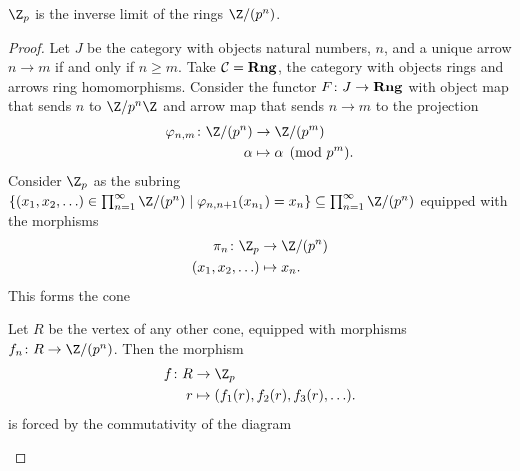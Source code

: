 \documentclass[10pt]{amsart}
\begin{document}
\begin{thm}\label{ex3}
  $\Z_p$ is the inverse limit of the rings $\Z/(p^n)$.
  \begin{proof}
    Let $J$ be the category with objects natural numbers, $n$, and a unique arrow $n \rightarrow m$ if and only if $n \geq m$.
    Take $\mathcal{C} = {\bf Rng}$, the category with objects rings and arrows ring homomorphisms.
    Consider the functor $F \colon J \rightarrow {\bf Rng}$ with object map that sends $n$ to $\Z/p^n\Z$ and arrow map that sends $n \rightarrow m$ to the projection 
    \begin{align*}
      \varphi_{n,m} \colon \Z/(p^n) &\rightarrow \Z/(p^m)\\
      \alpha &\mapsto \alpha \pmod{p^m}.
    \end{align*}
    Consider $\Z_p$ as the subring
    $\left\{(x_1, x_2, \ldots) \in \prod_{n=1}^\infty \Z/(p^n) \;\middle\vert\; \varphi_{n,n+1}(x_{n_1}) = x_n \right\} \subseteq \prod_{n=1}^\infty \Z/(p^n)$
    equipped with the morphisms 
    \begin{align*}
      \pi_n \colon \Z_p &\rightarrow \Z/(p^n)\\
      (x_1, x_2, \ldots) & \mapsto x_n.
    \end{align*}
    This forms the cone
    \begin{center}
    \end{center}
    Let $R$ be the vertex of any other cone, equipped with morphisms $f_n \colon R \rightarrow \Z/(p^n)$.
    Then the morphism 
    \begin{align*}
      f \colon R &\rightarrow \Z_p\\
      r &\mapsto (f_1(r), f_2(r), f_3(r), \ldots).
    \end{align*}
    is forced by the commutativity of the diagram
    \begin{center}
    \end{center}    

  \end{proof}
\end{thm}
\end{document}
